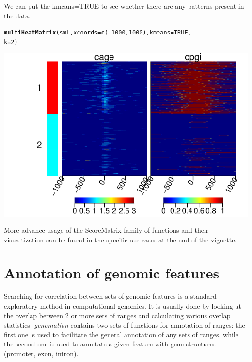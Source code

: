 \documentclass{article}\usepackage[]{graphicx}\usepackage[]{color}
\makeatletter
\def\maxwidth{ %
  \ifdim\Gin@nat@width>\linewidth
    \linewidth
  \else
    \Gin@nat@width
  \fi
}
\newcommand{\hlnum}[1]{\textcolor[rgb]{0.686,0.059,0.569}{#1}}%
\newcommand{\hlopt}[1]{\textcolor[rgb]{0,0,0}{#1}}%
\newcommand{\hlstd}[1]{\textcolor[rgb]{0.345,0.345,0.345}{#1}}%
\newcommand{\hlkwc}[1]{\textcolor[rgb]{0.333,0.667,0.333}{#1}}%
\newcommand{\hlkwd}[1]{\textcolor[rgb]{0.737,0.353,0.396}{\textbf{#1}}}%
\newenvironment{kframe}{%
 \def\at@end@of@kframe{}%
 \ifinner\ifhmode%
  \def\at@end@of@kframe{\end{minipage}}%
  \begin{minipage}{\columnwidth}%
 \fi\fi%
 \def\FrameCommand##1{\hskip\@totalleftmargin \hskip-\fboxsep
 \colorbox{shadecolor}{##1}\hskip-\fboxsep
     \hskip-\linewidth \hskip-\@totalleftmargin \hskip\columnwidth}%
 \MakeFramed {\advance\hsize-\width
   \@totalleftmargin\z@ \linewidth\hsize
   \@setminipage}}%
 {\par\unskip\endMakeFramed%
 \at@end@of@kframe}
\newenvironment{knitrout}{}{} %
\newcommand{\Rpackage}[1]{{\textit{#1}}}
\makeatother
\begin{document}
We can put the kmeans=TRUE to see whether there are any patterns present in the data.
\begin{knitrout}
\color{fgcolor}\begin{kframe}
\begin{alltt}
\hlkwd{multiHeatMatrix}\hlstd{(sml,} \hlkwc{xcoords} \hlstd{=} \hlkwd{c}\hlstd{(}\hlopt{-}\hlnum{1000}\hlstd{,} \hlnum{1000}\hlstd{),} \hlkwc{kmeans} \hlstd{=} \hlnum{TRUE}\hlstd{,}
    \hlkwc{k} \hlstd{=} \hlnum{2}\hlstd{)}
\end{alltt}
\end{kframe}

{\centering \includegraphics[width=\maxwidth]{FiguresmultiHeatMatrix2} 

}



\end{knitrout}



More advance usage of the ScoreMatrix family of functions and their
visualtization can be found in the specific use-cases at the end of the vignette.


\section{Annotation of genomic features}


Searching for correlation between sets of genomic features is a standard exploratory
method in computational genomics. It is usually done by looking at the overlap between 
2 or more sets of ranges and calculating various overlap statistics. 
\Rpackage{genomation} contains two sets of functions for annotation of ranges:
the first one is used to facilitate the general annotation of any sets of ranges,
while
the second one is used to annotate a given feature with gene structures (promoter, 
exon, intron).
\end{document}
